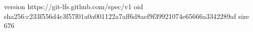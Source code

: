 version https://git-lfs.github.com/spec/v1
oid sha256:c233f556d4c3f57f01a0a001122a7aff6d8aef9f39921074e65666a3342289af
size 676
